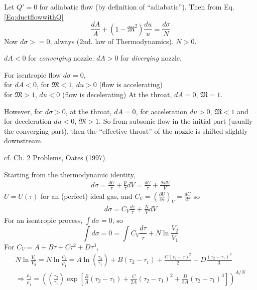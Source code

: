 \documentclass[10pt]{amsart}
\newcommand{\problemhead}[1]
  {
   \noindent{\small\bf Problem #1.}
   }
\begin{document}
\begin{multicols*}{2}
Let $Q'=0$ for adiabatic flow (by definition of ``adiabatic'').  Then from Eq. \ref{Eq:ductflowwithQ}
\[
\frac{dA}{A} + (1-\mathfrak{M}^2) \frac{du}{u} = \frac{d\sigma}{N}
\]
Now $d\sigma >=0$, always (2nd. law of Thermodynamics).  $N>0$.  

$dA<0$ for \emph{converging} nozzle.  
$dA >0$ for \emph{diverging} nozzle.

For isentropic flow $d\sigma =0$,  \\
for $dA<0$, for $\mathfrak{M}<1$, $du >0$ (flow is accelerating) \\
\phantom{for $dA<0$, } for $\mathfrak{M}>1$, $du <0$ (flow is decelerating)
\phantom{for $dA<0$, } At the throat, $dA=0$, $\mathfrak{M}=1$.  

However, for $d\sigma >0$, at the throat, $dA=0$, for acceleration $du>0$, $\mathfrak{M}<1$ and for deceleration $du<0$, $\mathfrak{M}>1$.  So from subsonic flow in the initial part (usually the converging part), then the ``effective throat'' of the nozzle is shifted slightly downstream.  




cf. Ch. 2 Problems, Oates (1997) \cite{GOates1997}

\problemhead{2.1}

Starting from the thermodynamic identity,
\[
\begin{gathered}
  d\sigma = \frac{dU}{\tau} + \frac{p}{\tau} dV  = \frac{dU}{\tau} + \frac{N dV}{V} 
\end{gathered}
\]
$U=U(\tau)$ for an (perfect) ideal gas, and $C_V = \left( \frac{ \partial U}{ \partial \tau} \right)_V = \frac{dU}{d\tau}$ so
\[
\begin{gathered}
  d\sigma = C_V \frac{d\tau}{\tau} + \frac{N}{V} dV
\end{gathered}
\]
For an isentropic process, $\int d\sigma =0$, so 
\[
\int d\sigma = 0 = \int C_V \frac{d\tau}{\tau} + N \ln{ \frac{V_2}{V_1}}
\]
For $C_V = A + B\tau + C\tau^2 + D\tau^3$,
\[
\begin{gathered}
  N \ln{ \frac{V_1}{V_2}} = N \ln{ \frac{\rho_2}{\rho_1} } = A\ln{ \left( \frac{\tau_2}{\tau_1} \right) } + B(\tau_2 - \tau_1) + \frac{C(\tau_2 - \tau)^2}{2} + D \frac{(\tau_2-\tau_1)^3}{3} \\
  \Longrightarrow \frac{ \rho_2}{\rho_1} = \left( \left( \frac{\tau_2}{\tau_1} \right) \exp{ \left[ \frac{B}{A} (\tau_2-\tau_1) + \frac{C}{2A} (\tau_2-\tau_1)^2 + \frac{D}{3A} (\tau_2-\tau_1)^3 \right] } \right)^{A/N}
\end{gathered}
\]


\end{multicols*}
\end{document}
